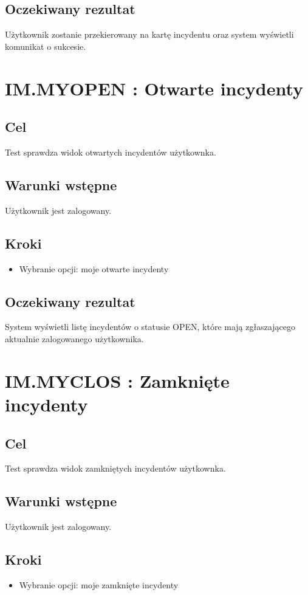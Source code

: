 \documentclass[a4paper, oneside, 11pt]{report}
\begin{document}
\subsection*{Oczekiwany rezultat}
Użytkownik zostanie przekierowany na kartę incydentu oraz system wyświetli komunikat o sukcesie.

\section{IM.MYOPEN : Otwarte incydenty}
\subsection*{Cel}
Test sprawdza widok otwartych incydentów użytkownka.
\subsection*{Warunki wstępne}
Użytkownik jest zalogowany.
\subsection*{Kroki}
\begin{itemize}
	\item Wybranie opcji: moje otwarte incydenty
\end{itemize}
\subsection*{Oczekiwany rezultat}
System wyświetli listę incydentów o statusie OPEN, które mają zgłaszającego aktualnie zalogowanego użytkownika.

\section{IM.MYCLOS : Zamknięte incydenty}
\subsection*{Cel}
Test sprawdza widok zamkniętych incydentów użytkownka.
\subsection*{Warunki wstępne}
Użytkownik jest zalogowany.
\subsection*{Kroki}
\begin{itemize}
	\item Wybranie opcji: moje zamknięte incydenty
\end{itemize}
\end{document}
